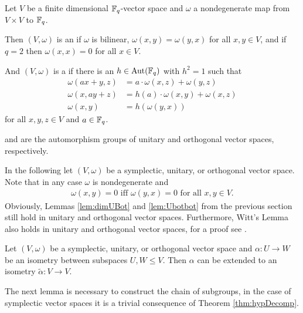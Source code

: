 \begin{definition}
	Let $V$ be a finite dimensional $\mathbb{F}_q$-vector space and $\omega$ a nondegenerate map from $V\times V$ to $\mathbb{F}_q$.
				
	Then $(V,\omega)$ is an  if $\omega$ is bilinear, $\omega(x,y)=\omega(y,x)$ for all $x,y\in V$, and if $q=2$ then $\omega(x,x)=0$ for all $x\in V$.
				
	And $(V,\omega)$ is a  if there is an $h\in\operatorname{Aut}(\mathbb{F}_q)$ with $h^2=1$ such that 
	\begin{align*}
		\omega(ax+y,z) & =a\cdot\omega(x,z)+\omega(y,z)    \\
		\omega(x,ay+z) & =h(a)\cdot\omega(x,y)+\omega(x,z) \\
		\omega(x,y)    & =h(\omega(y,x))              
	\end{align*}
	for all $x,y,z\in V$ and $a\in\mathbb{F}_q$.
				
	 and  are the automorphism groups of unitary and orthogonal vector spaces, respectively.
\end{definition}
		
In the following let $(V,\omega)$ be a symplectic, unitary, or orthogonal vector space.
Note that in any case $\omega$ is nondegenerate and 
\begin{align*}
	\omega(x,y)=0 \text{ iff }\omega(y,x)=0\text{ for all $x,y\in V$}. 
\end{align*}
Obviously, Lemmas \ref{lem:dimUBot} and \ref{lem:Ubotbot} from the previous section still hold in  unitary and orthogonal vector spaces. Furthermore, Witt's Lemma also holds in unitary and orthogonal vector spaces, for a proof see \cite{Witt}.
\begin{theorem}\label{thm:Witt}
	Let $(V,\omega)$ be a symplectic, unitary, or orthogonal vector space and $\alpha\colon U\to W$ be an isometry between subspaces $U,W\leq V$.
	Then $\alpha$ can be extended to an isometry $\tilde{\alpha}\colon V\to V$.
\end{theorem}
		
The next lemma is necessary to construct the chain of subgroups, in the case of symplectic vector spaces it is a trivial consequence of Theorem \ref{thm:hypDecomp}.
		
		
